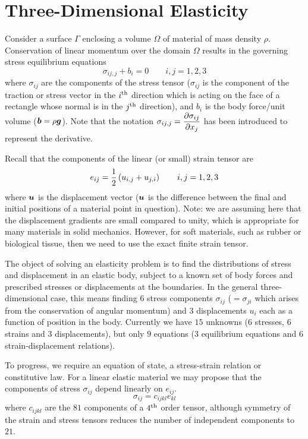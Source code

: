 \section{Three-Dimensional Elasticity}
\label{sec:3Delast}

Consider a surface $\Gamma$ enclosing a volume $\Omega$ of material of mass
density $\rho$.  Conservation of linear momentum over the domain $\Omega$
results in the governing stress equilibrium equations
\begin{equation}
  \sigma_{ij,j} + b_{i} =  0 \qquad i,j=1,2,3
  \label{eqn:equilib}
\end{equation}
where $\sigma_{ij}$ are the components of the stress tensor ($\sigma_{ij}$ is
the component of the traction or stress vector in the ${i}^{\text{th}}$ direction
which is acting on the face of a rectangle whose normal is in the ${j}^{\text{th}}$
direction), and $b_{i}$ is the body force/unit volume (\eg $ \boldsymbol{b}  =
\rho \boldsymbol{g} $). Note that the notation $\sigma_{ij,j} =
 \dfrac{\partial \sigma_{ij}}{\partial x_{j}} $ has been introduced to represent the derivative.

Recall that the components of the linear (or small) strain tensor are
\begin{equation}
  e_{ij} =  \dfrac{1}{2}\left( u_{i,j} + u_{j,i} \right) \qquad i,j=1,2,3
  \label{eqn:sst}
\end{equation}
where $ \boldsymbol{u} $ is the displacement vector (\ie $ \boldsymbol{u} $ is the difference
between the final and initial positions of a material point in
question). Note: we are assuming here that the displacement gradients are
small compared to unity, which is appropriate for many materials in solid
mechanics.  However, for soft materials, such as rubber or biological tissue,
then we need to use the exact finite strain tensor.

The object of solving an elasticity problem is to find the distributions of
stress and displacement in an elastic body, subject to a known set of body
forces and prescribed stresses or displacements at the boundaries.  In the
general three-dimensional case, this means finding $6$ stress components
$\sigma_{ij}$ ($=\sigma_{ji}$ which arises from the conservation of angular
momentum) and 3 displacements $u_{i}$ each as a function of position in the
body. Currently we have $15$ unknowns ($6$ stresses, $6$ strains and $3$
displacements), but only $9$ equations ($3$ equilibrium equations and $6$
strain-displacement relations).

To progress, we require an equation of state, \ie a stress-strain relation or
constitutive law.  For a linear elastic material we may propose that the
components of stress $\sigma_{ij}$ depend linearly on $e_{ij}$. \ie
\begin{displaymath}
  \sigma_{ij} = c_{ijkl}e_{kl}
\end{displaymath}  
where $c_{ijkl}$ are the $81$ components of a ${4}^{\text{th}}$ order tensor, although
symmetry of the strain and stress tensors reduces the number of independent
components to $21$.

